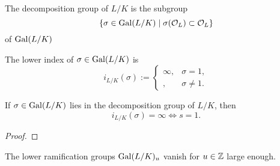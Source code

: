 \begin{definition}
    \label{decompositionGroup}
    \leanok
    The decomposition group of $L/K$ is the subgroup \[\{\sigma\in\operatorname{Gal}(L/K)\mid \sigma(\mathcal{O}_L) \subset \mathcal{O}_L\}\] of $\operatorname{Gal}(L/K)$ 
\end{definition}

\begin{definition}
    \label{lowerIndex}
    \leanok
    The lower index of $\sigma\in\operatorname{Gal}(L/K)$ is \[i_{L/K}(\sigma) := \begin{cases}
        \infty, &\sigma = 1,\\
        , &\sigma\ne 1.
    \end{cases}\]
\end{definition}

\begin{theorem}
    \label{lowerIndex_ne_one}

\end{theorem}

\begin{theorem}
    \label{lowerIndex_eq_top_iff_eq_refl}
    \leanok
    If $\sigma\in\operatorname{Gal}(L/K)$ lies in the decomposition group of $L/K$, then \[i_{L/K}(\sigma) = \infty\iff s = 1.\]
\end{theorem}
\begin{proof}
    \leanok
\end{proof}

\begin{theorem}
    \label{exist_lowerRamificationGroup_eq_bot}
    \leanok
    The lower ramification groups $\operatorname{Gal}(L/K)_{u}$ vanish for $u\in\mathbb{Z}$ large enough. 
\end{theorem}
